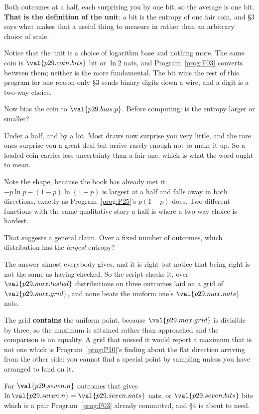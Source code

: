 \begin{fr}

Both outcomes at a half, each surprising you by one bit, so the average is one
bit. \textbf{That is the definition of the unit}: a bit is the entropy of one
fair coin, and §3 says what makes that a useful thing to measure in rather
than an arbitrary choice of scale.

Notice that the unit is a choice of logarithm base and nothing more. The same
coin is $\val{p29.coin.bits}$ bit or $\ln 2$ nats, and
Program~\ref{prog:F03} converts between them; neither is the more
fundamental. The bit wins the rest of this program for one reason only
\dash{} §3 sends binary digits down a wire, and a digit is a two-way choice.

Now bias the coin to $\val{p29.bias.p}$. Before computing: is the entropy
larger or smaller?
\dotline
\nextframe
\end{fr}

\begin{fr}

Under a half, and by a lot. Most draws now surprise you very little, and the
rare ones surprise you a great deal but arrive rarely enough not to make it
up. So a loaded coin carries less uncertainty than a fair one, which is what
the word ought to mean.

Note the shape, because the book has already met it:
$-p\ln p - (1-p)\ln(1-p)$ is largest at a half and falls away in both
directions, exactly as Program~\ref{prog:P25}'s $p(1-p)$ does. Two different
functions with the same qualitative story \dash{} a half is where a two-way
choice is hardest.

That suggests a general claim. Over a fixed number of outcomes, which
distribution has the \emph{largest} entropy?
\dotline
\nextframe
\end{fr}

\begin{fr}

The answer almost everybody gives, and it is right \dash{} but notice that
being right is not the same as having checked. So the script checks it, over
$\val{p29.max.tested}$ distributions on three outcomes laid on a grid of
$\val{p29.max.grid}$, and none beats the uniform one's
$\val{p29.max.nats}$ nats.

\begin{note}
The grid \textbf{contains} the uniform point, because $\val{p29.max.grid}$ is
divisible by three, so the maximum is attained rather than approached and the
comparison is an equality. A grid that missed it would report a maximum that
is not one \dash{} which is Program~\ref{prog:P10}'s finding about the flat
direction arriving from the other side: you cannot find a special point by
sampling unless you have arranged to land on it.
\end{note}

For $\val{p29.seven.n}$ outcomes that gives $\ln \val{p29.seven.n} =
\val{p29.seven.nats}$ nats, or $\val{p29.seven.bits}$ bits \dash{} which is a
pair Program~\ref{prog:F03} already committed, and §4 is about to need.
\end{fr}

